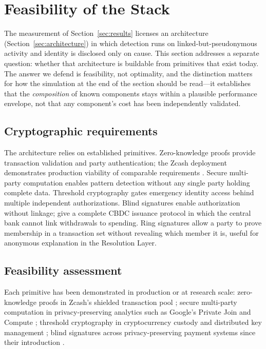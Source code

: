 \documentclass[11pt]{article}
\begin{document}
\section{Feasibility of the Stack}
\label{sec:feasibility}

The measurement of Section~\ref{sec:results} licenses an architecture (Section~\ref{sec:architecture})
in which detection runs on linked-but-pseudonymous activity and identity is disclosed only on cause.
This section addresses a separate question: whether that architecture is buildable from primitives
that exist today. The answer we defend is feasibility, not optimality, and the distinction matters
for how the simulation at the end of the section should be read---it establishes that the
\emph{composition} of known components stays within a plausible performance envelope, not that any
component's cost has been independently validated.

\subsection{Cryptographic requirements}

The architecture relies on established primitives. Zero-knowledge proofs provide transaction
validation and party authentication; the Zcash deployment demonstrates production viability of
comparable requirements \citep{Sasson2014}. Secure multi-party computation enables pattern detection
without any single party holding complete data. Threshold cryptography gates emergency identity
access behind multiple independent authorizations. Blind signatures enable authorization without
linkage; \citet{ChaumGrothoffMoser2021} give a complete CBDC issuance protocol in which the central
bank cannot link withdrawals to spending. Ring signatures allow a party to prove membership in a
transaction set without revealing which member it is, useful for anonymous explanation in the
Resolution Layer.

\subsection{Feasibility assessment}

Each primitive has been demonstrated in production or at research scale: zero-knowledge proofs in
Zcash's shielded transaction pool \citep{ElectricCoin2023}; secure multi-party computation in
privacy-preserving analytics such as Google's Private Join and Compute \citep{Google2019}; threshold
cryptography in cryptocurrency custody and distributed key management \citep{Gennaro2016}; blind
signatures across privacy-preserving payment systems since their introduction \citep{Chaum1982}.
\end{document}

